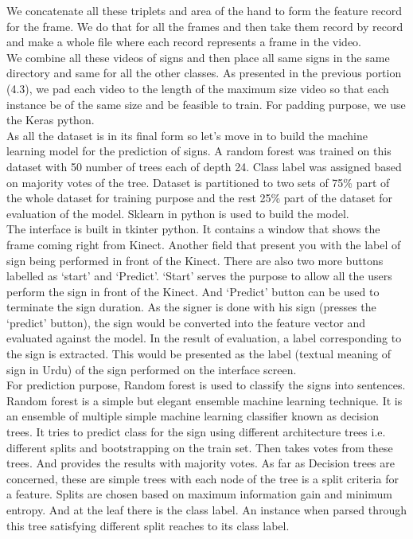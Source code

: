 We concatenate all these triplets and area of the hand to form the feature record for the frame. We do that for all the frames and then take them record by record and make a whole file where each record represents a frame in the video.
\\
We combine all these videos of signs and then place all same signs in the same directory and same for all the other classes. As presented in the previous portion (4.3), we pad each video to the length of the maximum size video so that each instance be of the same size and be feasible to train. For padding purpose, we use the Keras python. \\
As all the dataset is in its final form so let’s move in to build the machine learning model for the prediction of signs. A random forest was trained on this dataset with 50 number of trees each of depth 24. Class label was assigned based on majority votes of the tree. Dataset is partitioned to two sets of 75\% part of the whole dataset for training purpose and the rest 25\% part of the dataset for evaluation of the model. Sklearn in python is used to build the model.\\
The interface is built in tkinter python. It contains a window that shows the frame coming right from Kinect. Another field that present you with the label of sign being performed in front of the Kinect. There are also two more buttons labelled as ‘start’ and ‘Predict’. ‘Start’ serves the purpose to allow all the users perform the sign in front of the Kinect. And ‘Predict’ button can be used to terminate the sign duration. As the signer is done with his sign (presses the ‘predict’ button), the sign would be converted into the feature vector and evaluated against the model. In the result of evaluation, a label corresponding to the sign is extracted. This would be presented as the label (textual meaning of sign in Urdu) of the sign performed on the interface screen. \\
For prediction purpose, Random forest is used to classify the signs into sentences. Random forest is a simple but elegant ensemble machine learning technique. It is an ensemble of multiple simple machine learning classifier known as decision trees. It tries to predict class for the sign using different architecture trees i.e. different splits and bootstrapping on the train set. Then takes votes from these trees. And provides the results with majority votes.
As far as Decision trees are concerned, these are simple trees with each node of the tree is a split criteria for a feature. Splits are chosen based on maximum information gain and minimum entropy. And at the leaf there is the class label. An instance when parsed through this tree satisfying different split reaches to its class label. 

